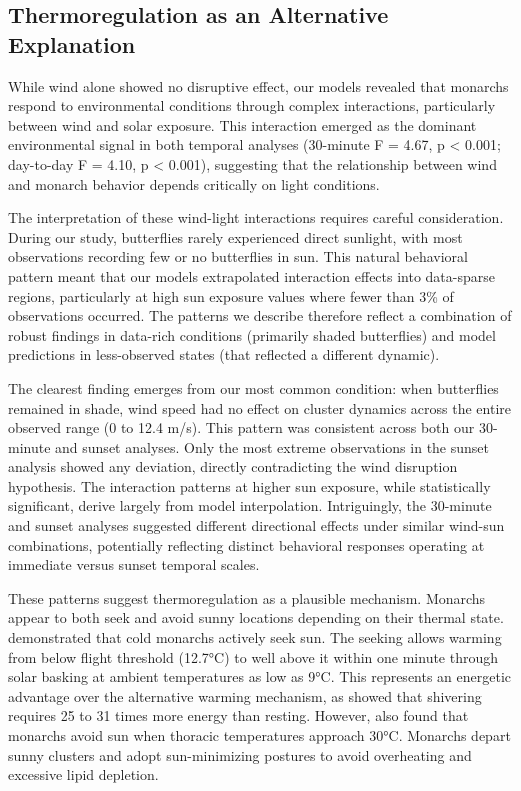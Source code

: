 \subsection{Thermoregulation as an Alternative Explanation}

While wind alone showed no disruptive effect, our models revealed that monarchs respond to environmental conditions through complex interactions, particularly between wind and solar exposure. This interaction emerged as the dominant environmental signal in both temporal analyses (30-minute F = 4.67, p < 0.001; day-to-day F = 4.10, p < 0.001), suggesting that the relationship between wind and monarch behavior depends critically on light conditions.

The interpretation of these wind-light interactions requires careful consideration. During our study, butterflies rarely experienced direct sunlight, with most observations recording few or no butterflies in sun. This natural behavioral pattern meant that our models extrapolated interaction effects into data-sparse regions, particularly at high sun exposure values where fewer than 3\% of observations occurred. The patterns we describe therefore reflect a combination of robust findings in data-rich conditions (primarily shaded butterflies) and model predictions in less-observed states (that reflected a different dynamic).

The clearest finding emerges from our most common condition: when butterflies remained in shade, wind speed had no effect on cluster dynamics across the entire observed range (0 to 12.4 m/s). This pattern was consistent across both our 30-minute and sunset analyses. Only the most extreme observations in the sunset analysis showed any deviation, directly contradicting the wind disruption hypothesis. The interaction patterns at higher sun exposure, while statistically significant, derive largely from model interpolation. Intriguingly, the 30-minute and sunset analyses suggested different directional effects under similar wind-sun combinations, potentially reflecting distinct behavioral responses operating at immediate versus sunset temporal scales.

These patterns suggest thermoregulation as a plausible mechanism. Monarchs appear to both seek and avoid sunny locations depending on their thermal state. \textcite{mastersMonarchButterflyDanaus1988} demonstrated that cold monarchs actively seek sun. The seeking allows warming from below flight threshold (12.7°C) to well above it within one minute through solar basking at ambient temperatures as low as 9°C. This represents an energetic advantage over the alternative warming mechanism, as \textcite{kammerThoracicTemperatureShivering1970} showed that shivering requires 25 to 31 times more energy than resting. However, \textcite{mastersMonarchButterflyDanaus1988} also found that monarchs avoid sun when thoracic temperatures approach 30°C. Monarchs depart sunny clusters and adopt sun-minimizing postures to avoid overheating and excessive lipid depletion.

